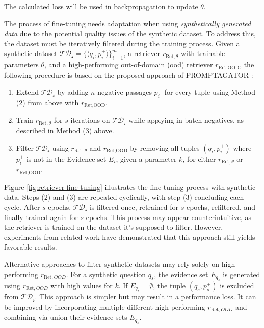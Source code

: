 The calculated loss will be used in backpropagation to update $\theta$.

The process of fine-tuning needs adaptation when using \textit{synthetically generated data} due to the potential quality issues of the synthetic dataset. To address this, the dataset must be iteratively filtered during the training process. Given a synthetic dataset $\mathcal{TD_s} = \{\langle q_i, p_i^+\rangle\}_{i=1}^m$, a retriever $r_{\text{Ret}, \theta}$ with trainable parameters $\theta$, and a high-performing out-of-domain (\gls{ood}) retriever $r_{\text{Ret},\text{OOD}}$, the following procedure is based on the proposed approach of PROMPTAGATOR \cite{dai_promptagator_2022}:

\begin{enumerate}
    \item Extend $\mathcal{TD_s}$ by adding $n$ negative passages $p_i^-$ for every tuple using Method (2) from above with $r_{\text{Ret},\text{OOD}}$.
    \item Train $r_{\text{Ret}, \theta}$ for $s$ iterations on $\mathcal{TD_s}$ while applying in-batch negatives, as described in Method (3) above.
    \item Filter $\mathcal{TD_s}$ using $r_{\text{Ret}, \theta}$ and $r_{\text{Ret}, \text{OOD}}$ by removing all tuples $(q_i, p_i^+)$ where $p_i^+$ is not in the Evidence set $E_i$, given a parameter $k$, for either $r_{\text{Ret}, \theta}$ or $r_{\text{Ret}, \text{OOD}}$.
\end{enumerate}

Figure \ref{fig:retriever-fine-tuning} illustrates the fine-tuning process with synthetic data. Steps (2) and (3) are repeated cyclically, with step (3) concluding each cycle. After $s$ epochs, $\mathcal{TD_s}$ is filtered once, retrained for $s$ epochs, refiltered, and finally trained again for $s$ epochs. This process may appear counterintuitive, as the retriever is trained on the dataset it's supposed to filter. However, experiments from related work \cite{dai_promptagator_2022} have demonstrated that this approach still yields favorable results. 

Alternative approaches to filter synthetic datasets may rely solely on high-performing $r_{\text{Ret}, OOD}$. For a synthetic question $q_s$, the evidence set $E_{q_s}$ is generated using $r_{\text{Ret}, OOD}$ with high values for $k$. If $E_{q_s} = \emptyset$, the tuple $(q_s, p_s^+)$ is excluded from $\mathcal{TD_s}$. This approach is simpler but may result in a performance loss. It can be improved by incorporating multiple different high-performing $r_{\text{Ret}, OOD}$ and combining via union their evidence sets $E_{q_s}$.


